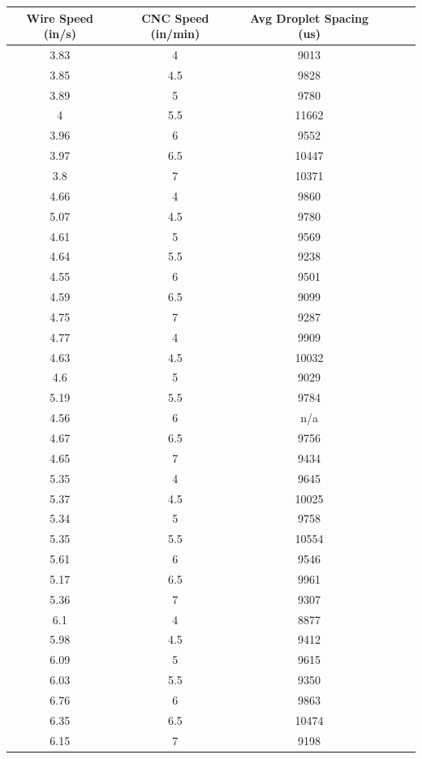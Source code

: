 \documentclass[12pt]{article}
\begin{document}
\begin{center}
\begin{tabular}{ |c|c|c|c|c|c| }
 
\end{tabular}


\end{center}

\clearpage


\begin{center}

\begin{tabular}{ |c|c|c|c|c|c| }


  \hline
  \textbf{Wire Speed (in/s)} & \textbf{CNC Speed (in/min)} & \textbf{Avg Droplet Spacing (us)} \\ \hline
3.83 &	4 &	9013 \\ \hline
3.85 &	4.5 &	9828 \\ \hline
3.89 &	5 &	9780 \\ \hline
4 &	5.5 &	11662 \\ \hline
3.96 &	6 &	9552 \\ \hline
3.97 &	6.5 &	10447 \\ \hline
3.8 &	7 &	10371 \\ \hline \hline
4.66 &	4 &	9860 \\ \hline
5.07 &	4.5 &	9780 \\ \hline
4.61 &	5 &	9569 \\ \hline
4.64 &	5.5 &	9238 \\ \hline
4.55 &	6 &	9501 \\ \hline
4.59 &	6.5 &	9099 \\ \hline
4.75 &	7 &	9287 \\ \hline \hline
4.77 &	4 &	9909 \\ \hline
4.63 &	4.5 &	10032 \\ \hline
4.6 &	5 &	9029 \\ \hline
5.19 &	5.5 &	9784 \\ \hline
4.56 &	6 &	n/a \\ \hline
4.67 &	6.5 &	9756 \\ \hline
4.65 &	7 &	9434 \\ \hline \hline
5.35 &	4 &	9645 \\ \hline
5.37 &	4.5 &	10025 \\ \hline
5.34 &	5 &	9758 \\ \hline
5.35 &	5.5 &	10554 \\ \hline
5.61 &	6 &	9546 \\ \hline
5.17 &	6.5 &	9961 \\ \hline
5.36 &	7 &	9307 \\ \hline \hline
6.1 &	4 &	8877 \\ \hline
5.98 &	4.5 &	9412 \\ \hline
6.09 &	5 &	9615 \\ \hline
6.03 &	5.5 &	9350 \\ \hline
6.76 &	6 &	9863 \\ \hline
6.35 &	6.5 &	10474 \\ \hline
6.15 &	7 &	9198 \\ \hline




\end{tabular}
\end{center}
\end{document}
